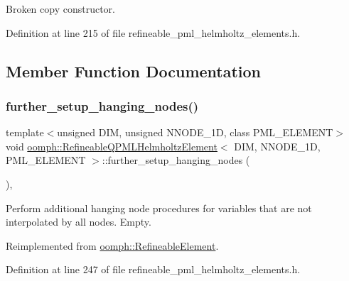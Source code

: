 Broken copy constructor. 



Definition at line 215 of file refineable\+\_\+pml\+\_\+helmholtz\+\_\+elements.\+h.



\subsection{Member Function Documentation}
\mbox{\label{classoomph_1_1RefineableQPMLHelmholtzElement_ac512e133c8fde649cd6aa437ae85b008}} 
\subsubsection{\texorpdfstring{further\+\_\+setup\+\_\+hanging\+\_\+nodes()}{further\_setup\_hanging\_nodes()}}
{\footnotesize\ttfamily template$<$unsigned D\+IM, unsigned N\+N\+O\+D\+E\+\_\+1D, class P\+M\+L\+\_\+\+E\+L\+E\+M\+E\+NT$>$ \\
void \hyperlink{classoomph_1_1RefineableQPMLHelmholtzElement}{oomph\+::\+Refineable\+Q\+P\+M\+L\+Helmholtz\+Element}$<$ D\+IM, N\+N\+O\+D\+E\+\_\+1D, P\+M\+L\+\_\+\+E\+L\+E\+M\+E\+NT $>$\+::further\+\_\+setup\+\_\+hanging\+\_\+nodes (\begin{DoxyParamCaption}{ }\end{DoxyParamCaption})\hspace{0.3cm}{\ttfamily [inline]}, {\ttfamily [virtual]}}



Perform additional hanging node procedures for variables that are not interpolated by all nodes. Empty. 



Reimplemented from \hyperlink{classoomph_1_1RefineableElement_a86ea01c485f7ff822dce74b884312ccb}{oomph\+::\+Refineable\+Element}.



Definition at line 247 of file refineable\+\_\+pml\+\_\+helmholtz\+\_\+elements.\+h.

\mbox{\label{classoomph_1_1RefineableQPMLHelmholtzElement_a27c58bf38a4229ef81ba7f7e8d41da07}} 
